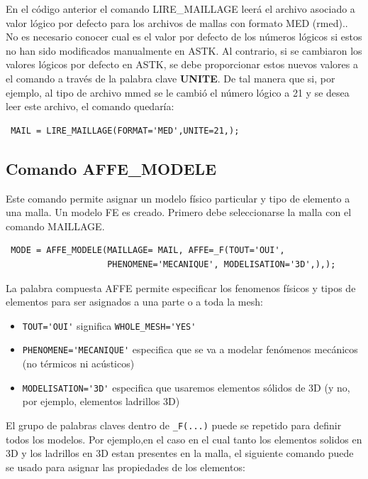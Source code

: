 \documentclass[12pt]{book}
\theoremstyle{definition}
\theoremstyle{remark}
\theoremstyle{plain}
\begin{document}
En el código anterior el comando LIRE\_MAILLAGE leerá el archivo asociado a valor 
lógico por defecto para los archivos de mallas con formato MED (rmed).. No es necesario
conocer cual es el valor por defecto de los números lógicos si estos no han
sido modificados manualmente en ASTK. Al contrario, si se cambiaron los
valores lógicos por defecto en ASTK, se debe proporcionar estos nuevos valores a el
comando a través de la palabra clave \textbf{UNITE}. De tal manera que si, por ejemplo,
al tipo de archivo mmed se le cambió el número lógico a 21 y se desea leer este
archivo, el comando quedaría:

\begin{verbatim}
 MAIL = LIRE_MAILLAGE(FORMAT='MED',UNITE=21,);
\end{verbatim}

\subsection{Comando AFFE\_MODELE}

Este comando permite asignar un modelo físico particular y tipo de elemento 
a una malla. Un modelo FE es creado. Primero debe seleccionarse la malla con el
 comando MAILLAGE. 


\begin{verbatim}
 MODE = AFFE_MODELE(MAILLAGE= MAIL, AFFE=_F(TOUT='OUI',
                    PHENOMENE='MECANIQUE', MODELISATION='3D',),);
\end{verbatim}

La palabra compuesta AFFE permite especificar los fenomenos
físicos y tipos de elementos para ser asignados a una parte o a toda la mesh:

\begin{itemize}
 \item \verb*|TOUT='OUI'| significa \verb*|WHOLE_MESH='YES'|
 \item \verb*|PHENOMENE='MECANIQUE'| especifica que se va a modelar fenómenos
        mecánicos (no térmicos ni acústicos)
 \item \verb*|MODELISATION='3D'| especifica que usaremos elementos sólidos de 3D
       (y no, por ejemplo, elementos ladrillos 3D)
\end{itemize}

El grupo de palabras claves dentro de \verb*|_F(...)| puede se repetido para
definir todos los modelos. Por ejemplo,en el caso en el cual tanto los elementos 
solidos en 3D y los ladrillos en 3D estan presentes en la malla, el siguiente comando
puede se usado para asignar las propiedades de los elementos:
\end{document}
